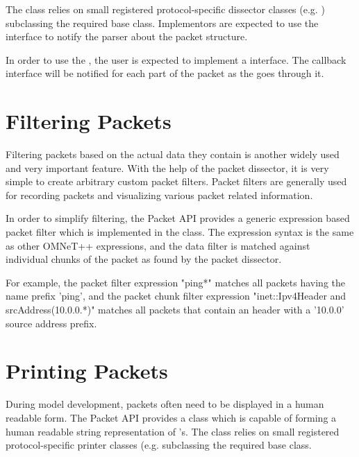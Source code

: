 The  class relies on small registered
protocol-specific dissector classes (e.g. )
subclassing the required  base class. Implementors
are expected to use the  interface to
notify the parser about the packet structure.


In order to use the , the user is expected to
implement a   interface. The callback
interface will be notified for each part of the packet as the
 goes through it.


\section{Filtering Packets}
\label{sec:packets:filtering-packets}

Filtering packets based on the actual data they contain is another widely used
and very important feature. With the help of the packet dissector, it is very
simple to create arbitrary custom packet filters. Packet filters are generally
used for recording packets and visualizing various packet related information.

In order to simplify filtering, the Packet API provides a generic expression
based packet filter which is implemented in the  class.
The expression syntax is the same as other OMNeT++ expressions, and the data
filter is matched against individual chunks of the packet as found by the packet
dissector.

For example, the packet filter expression "ping*" matches all packets having the
name prefix 'ping', and the packet chunk filter expression "inet::Ipv4Header and
srcAddress(10.0.0.*)" matches all packets that contain an  header
with a '10.0.0' source address prefix.


\section{Printing Packets}
\label{sec:packets:printing-packets}

During model development, packets often need to be displayed in a human readable
form. The Packet API provides a  class which is capable
of forming a human readable string representation of 's. The
 class relies on small registered protocol-specific
printer classes (e.g.  subclassing the required
 base class.

